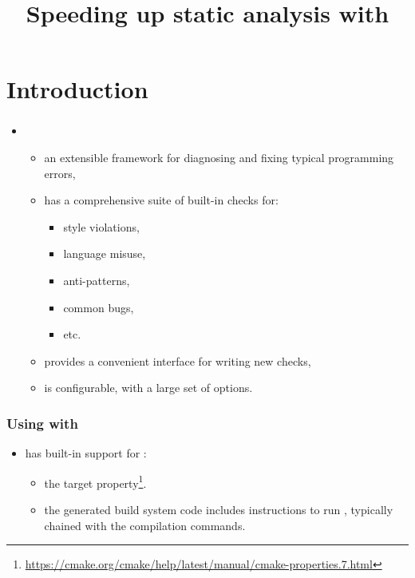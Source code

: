 \documentclass[compress,table,xcolor=table]{beamer}
\begin{document}
\title{Speeding up static analysis with }
\section{Introduction}
\frame{\titlepage}
\begin{frame}
  \Huge
\end{frame}
\begin{frame}
  \frametitle{}
  \begin{itemize}
      \item{\LARGE{}}
      \begin{itemize}
      \item{an extensible framework for diagnosing and fixing typical
          programming errors,}
      \item{has a comprehensive suite of built-in checks for:}
        \begin{itemize}
        \item{style violations,}
        \item{language misuse,}
        \item{anti-patterns,}
        \item{common bugs,}
        \item{etc.}
        \end{itemize}
      \item{provides a convenient interface for writing new checks,}
      \item{is configurable, with a large set of options.}
      \end{itemize}
  \end{itemize}
\end{frame}
\begin{frame}
    \frametitle{Using  with }
    \LARGE
    \begin{itemize}
    \item {} has built-in support for :
        \Large
        \begin{itemize}
        \item the  target property\footnote{
                \url{https://cmake.org/cmake/help/latest/manual/cmake-properties.7.html}}.
        \item the generated build system code includes instructions to run
            , typically chained with the compilation
                commands.
        \end{itemize}
    \end{itemize}
\end{frame}
\end{document}
